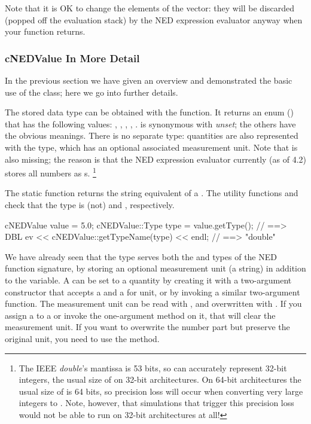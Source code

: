 \begin{note}
Note that it is OK to change the elements of the  vector: they
will be discarded (popped off the evaluation stack) by the NED expression
evaluator anyway when your function returns.
\end{note}


\subsubsection{cNEDValue In More Detail}

In the previous section we have given an overview and demonstrated the basic
use of the  class; here we go into further details.

The stored data type can be obtained with the  function.
It returns an enum () that has the following values:
, , , , .  is
synonymous with \textit{unset}; the others have the obvious meanings. There
is no separate  type: quantities are also represented with
the  type, which has an optional associated measurement unit. Note
that  is also missing; the reason is that the NED expression
evaluator currently (as of {\opp} 4.2) stores all numbers as s.
  \footnote{The IEEE \textit{double}'s mantissa is 53 bits, so 
  can accurately represent 32-bit integers, the usual size of  on
  32-bit architectures. On 64-bit architectures the usual size of 
  is 64 bits, so precision loss will occur when converting very large integers
  to . Note, however, that simulations that trigger this precision
  loss would not be able to run on 32-bit architectures at all!}

The  static function returns the string equivalent of
a . The utility functions  and
 check that the type is (not)  and ,
respectively.

\begin{cpp}
cNEDValue value = 5.0;
cNEDValue::Type type = value.getType(); // ==> DBL
ev << cNEDValue::getTypeName(type) << endl; // ==> "double"
\end{cpp}

We have already seen that the  type serves both the
 and  types of the NED function
signature, by storing an optional measurement unit (a string)
in addition to the  variable. A  can be set
to a quantity by creating it with a two-argument constructor that accepts
a  and a  for unit, or by invoking a similar
two-argument  function. The measurement unit can be read with
, and overwritten with . If you assign a
 to a  or invoke the one-argument
 method on it, that will clear the measurement unit. If you
want to overwrite the number part but preserve the original unit, you need
to use the  method.

